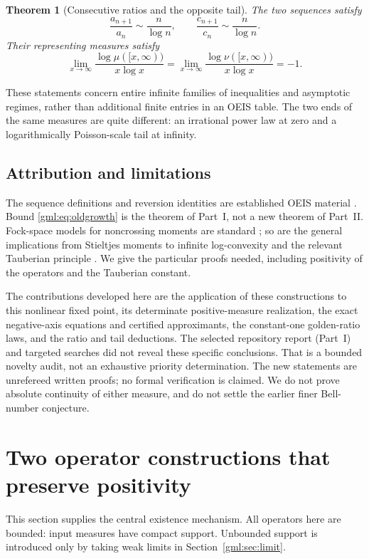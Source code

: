 \documentclass[11pt]{article}
\numberwithin{equation}{section}
\newtheorem{theorem}{Theorem}[section]
\theoremstyle{definition}
\theoremstyle{remark}
\begin{document}
\begin{theorem}[Consecutive ratios and the opposite tail]\label{gml:thm:maintail}
The two sequences satisfy
\begin{equation}\label{gml:eq:ratios}
 \frac{a_{n+1}}{a_n}\sim\frac{n}{\log n},\qquad
 \frac{c_{n+1}}{c_n}\sim\frac{n}{\log n}.
\end{equation}
Their representing measures satisfy
\begin{equation}\label{gml:eq:tails}
 \lim_{x\to\infty}\frac{\log\mu([x,\infty))}{x\log x}
 =\lim_{x\to\infty}\frac{\log\nu([x,\infty))}{x\log x}=-1.
\end{equation}
\end{theorem}

These statements concern entire infinite families of inequalities and
asymptotic regimes, rather than additional finite entries in an OEIS table.
The two ends of the same measures are quite different: an irrational power
law at zero and a logarithmically Poisson-scale tail at infinity.

\subsection{Attribution and limitations}\label{gml:sec:scope}
The sequence definitions and reversion identities are established OEIS
material \cite{oeis-a088714,oeisC}. Bound \eqref{gml:eq:oldgrowth} is the
theorem of Part~I, not a new theorem of Part~II. Fock-space models for noncrossing
moments are standard \cite{nica}; so are the general implications from
Stieltjes moments to infinite log-convexity \cite{wangzhu} and the relevant
Tauberian principle \cite{langer}. We give the particular proofs needed,
including positivity of the operators and the Tauberian constant.

The contributions developed here are the application of these constructions
to this nonlinear fixed point, its determinate positive-measure realization,
the exact negative-axis equations and certified approximants, the
constant-one golden-ratio laws, and the ratio and tail deductions. The
selected repository report (Part~I) and targeted searches did not reveal
these specific conclusions. That is a bounded novelty audit, not an exhaustive
priority determination. The new statements are unrefereed written proofs;
no formal verification is claimed. We do not prove absolute continuity of
either measure, and do not settle the earlier finer Bell-number conjecture.

\section{Two operator constructions that preserve positivity}\label{gml:sec:operators}
This section supplies the central existence mechanism. All operators here
are bounded: input measures have compact support. Unbounded support is
introduced only by taking weak limits in Section~\ref{gml:sec:limit}.
\end{document}
